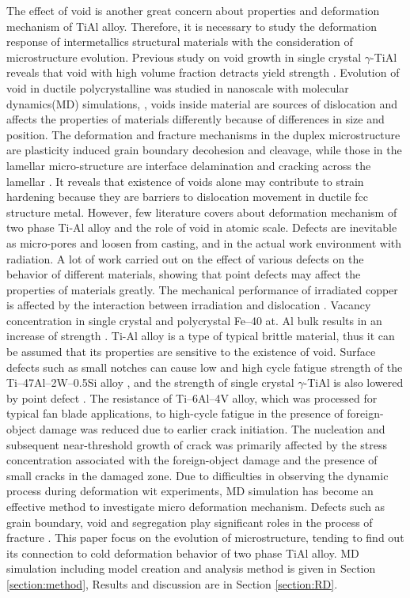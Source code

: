 \documentclass[materials,article,submit,moreauthors,pdftex,10pt,a4paper]{Definitions/mdpi}
\begin{document}
The effect of void is another great concern about properties and deformation mechanism  of TiAl alloy.  Therefore, it is necessary to study the deformation response of intermetallics structural materials with the consideration of microstructure evolution. Previous study on void growth in single crystal $\gamma$-TiAl reveals that void with high volume fraction detracts yield strength \cite{Tang2014, Xu2011}. Evolution of void in ductile polycrystalline was studied in nanoscale with molecular dynamics(MD) simulations, \cite{Jing2018a,Elkhateeb2018}, voids inside material are sources of dislocation and affects the properties of materials differently because of differences in size and position.  The deformation and fracture mechanisms in the duplex microstructure are plasticity induced grain boundary decohesion and cleavage, while those in the lamellar micro-structure are interface delamination and cracking across the lamellar \cite{Tang2014}. It reveals that existence of voids alone may contribute to strain hardening because they are barriers to dislocation movement in ductile fcc structure metal\cite{Xiong2015}. However, few literature covers about deformation mechanism of two phase Ti-Al alloy and the role of void in atomic scale. Defects are inevitable as micro-pores and loosen from casting, and in the actual work environment with radiation. A lot of work carried out on the  effect of various defects on the behavior of different materials, showing that point defects may affect the properties of materials greatly. The mechanical performance of irradiated copper is affected by the interaction between irradiation and dislocation \cite{Kiener2011b}. Vacancy concentration in single crystal and polycrystal Fe–40 at. Al bulk results in an increase of strength \cite{Yang1998}. Ti-Al alloy is a type of typical brittle material, thus it can be assumed that its properties are sensitive to the existence of void. Surface defects such as small notches can cause low and high cycle fatigue strength of the Ti–47Al–2W–0.5Si alloy \cite{Nazmy2001}, and the strength of single crystal $\gamma$-TiAl is also lowered by point defect \cite{Wu2016}. The resistance of Ti–6Al–4V alloy, which was processed for typical fan blade applications, to high-cycle fatigue in the presence of foreign- object damage was reduced due to earlier crack initiation.  The nucleation and subsequent near-threshold growth of crack was primarily affected by the stress concentration associated with the foreign-object damage and the presence of small cracks in the damaged zone. Due to difficulties in observing the dynamic process during deformation wit experiments, MD simulation has become an effective method to investigate micro deformation mechanism. Defects such as grain boundary, void and segregation play significant roles in the process of fracture \cite{Larsen2016}. This paper focus on the evolution of microstructure, tending to find out its connection to cold deformation behavior of two phase TiAl alloy. MD simulation including model creation and analysis method is given in Section \ref{section:method}, Results and discussion are in Section \ref{section:RD}.
\end{document}
